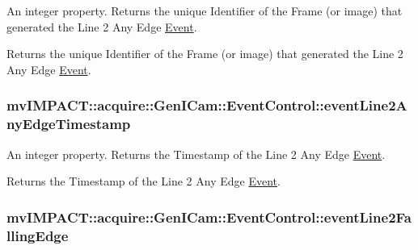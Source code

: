 An integer property. Returns the unique Identifier of the Frame (or image) that generated the Line 2 Any Edge \hyperlink{classmv_i_m_p_a_c_t_1_1acquire_1_1_event}{Event}. 

Returns the unique Identifier of the Frame (or image) that generated the Line 2 Any Edge \hyperlink{classmv_i_m_p_a_c_t_1_1acquire_1_1_event}{Event}. \hypertarget{classmv_i_m_p_a_c_t_1_1acquire_1_1_gen_i_cam_1_1_event_control_abf4d857e7c167e6b1979f78970387fa6}{
\subsubsection[{event\+Line2\+Any\+Edge\+Timestamp}]{ mv\+I\+M\+P\+A\+C\+T\+::acquire\+::\+Gen\+I\+Cam\+::\+Event\+Control\+::event\+Line2\+Any\+Edge\+Timestamp}}\label{classmv_i_m_p_a_c_t_1_1acquire_1_1_gen_i_cam_1_1_event_control_abf4d857e7c167e6b1979f78970387fa6}


An integer property. Returns the Timestamp of the Line 2 Any Edge \hyperlink{classmv_i_m_p_a_c_t_1_1acquire_1_1_event}{Event}. 

Returns the Timestamp of the Line 2 Any Edge \hyperlink{classmv_i_m_p_a_c_t_1_1acquire_1_1_event}{Event}. \hypertarget{classmv_i_m_p_a_c_t_1_1acquire_1_1_gen_i_cam_1_1_event_control_a3f9dd39d514270395509ec97f096991f}{
\subsubsection[{event\+Line2\+Falling\+Edge}]{ mv\+I\+M\+P\+A\+C\+T\+::acquire\+::\+Gen\+I\+Cam\+::\+Event\+Control\+::event\+Line2\+Falling\+Edge}}\label{classmv_i_m_p_a_c_t_1_1acquire_1_1_gen_i_cam_1_1_event_control_a3f9dd39d514270395509ec97f096991f}


